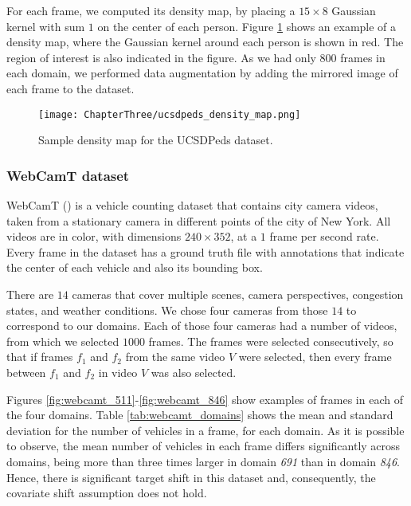 For each frame, we computed its density map, by placing a $15 \times 8$ Gaussian kernel with sum $1$ on the center of each person. Figure \ref{fig:ucsdpeds_density_map} shows an example of a density map, where the Gaussian kernel around each person is shown in red. The region of interest is also indicated in the figure. As we had only $800$ frames in each domain, we performed data augmentation by adding the mirrored image of each frame to the dataset. 

\begin{figure}[!ht]
	\centering
	\texttt{[image: ChapterThree/ucsdpeds\_density\_map.png]}   
	\caption{Sample density map for the UCSDPeds dataset.}
	\label{fig:ucsdpeds_density_map}
\end{figure}

\subsubsection{WebCamT dataset}
\label{sec:da_sensors_webcamt}

WebCamT (\citet{Zhang2017b}) is a vehicle counting dataset that contains city camera videos, taken from a stationary camera in different points of the city of New York. All videos are in color, with dimensions $240 \times 352$, at a $1$ frame per second rate. Every frame in the dataset has a ground truth file with annotations that indicate the center of each vehicle and also its bounding box. 

There are $14$ cameras that cover multiple scenes, camera perspectives, congestion states, and weather conditions. We chose four cameras from those $14$ to correspond to our domains. Each of those four cameras had a number of videos, from which we selected $1000$ frames. The frames were selected consecutively, so that if frames $f_1$ and $f_2$ from the same video $V$ were selected, then every frame between $f_1$ and $f_2$ in video $V$ was also selected.

Figures \ref{fig:webcamt_511}-\ref{fig:webcamt_846} show examples of frames in each of the four domains. Table \ref{tab:webcamt_domains} shows the mean and standard deviation for the number of vehicles in a frame, for each domain. As it is possible to observe, the mean number of vehicles in each frame differs significantly across domains, being more than three times larger in domain \textit{691} than in domain \textit{846}. Hence, there is significant target shift in this dataset and, consequently, the covariate shift assumption does not hold.


